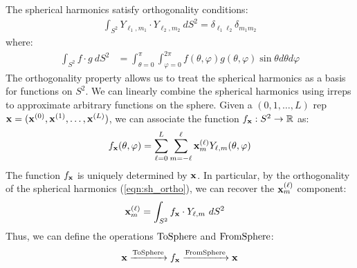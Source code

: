 The spherical harmonics satisfy orthogonality conditions:
\begin{align}
    \label{eqn:sh_ortho}
    \int_{S^2} Y_{\ell_1,m_1} \cdot Y_{\ell_2,m_2} \
    dS^2 = \delta_{\ell_1\ell_2}
    \delta_{m_1m_2}
\end{align}
where:
\begin{align}
    \label{eqn:s2_integral}
    \int_{S^2}
    f \cdot  g \
    dS^2 &= \int_{\theta = 0}^{\pi}
    \int_{\varphi = 0}^{2\pi}
    f(\theta, \varphi) g(\theta,\varphi)
    \sin \theta d\theta d \varphi
\end{align}
The orthogonality property allows us to treat the spherical harmonics as a basis for functions on $S^2$.
We can linearly combine the spherical harmonics using irreps to approximate arbitrary functions on the sphere.
Given a $(0, 1, \ldots, L)$ rep $\mathbf{x} = (\mathbf{x}^{(0)}, \mathbf{x}^{(1)}, \ldots, \mathbf{x}^{(L)})$, we can associate the function $f_{\mathbf{x}}: S^2 \rightarrow \mathbb{R}$ as:
\begin{align}
f_{\mathbf{x}}(\theta, \varphi) = \sum_{\ell = 0}^{L} 
\sum_{m = -\ell}^{\ell}
\mathbf{x}^{(\ell)}_{m}Y_{\ell,m}(\theta,\varphi)
\end{align}
The function $f_{\mathbf{x}}$ is uniquely determined by $\mathbf{x}$. In particular, by the orthogonality of the spherical harmonics (\autoref{eqn:sh_ortho}), we can recover the $\mathbf{x}^{(\ell)}_{m}$ component:
\begin{align}
\mathbf{x}^{(\ell)}_{m} &= \int_{S^2}
f_{\mathbf{x}} \cdot  Y_{\ell,m} \
dS^2
\end{align}
Thus, we can define the operations $\mathrm{ToSphere}$ and $\mathrm{FromSphere}$:
\begin{align}
    \mathbf{x} \xrightarrow{\mathrm{ToSphere}} f_{\mathbf{x}}
    \xrightarrow{\mathrm{FromSphere}} \mathbf{x}
\end{align}